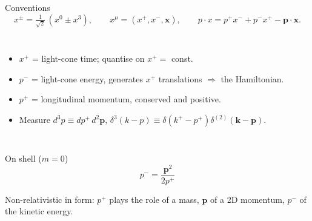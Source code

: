 \documentclass[9pt,aspectratio=169]{beamer}
\newcommand{\hl}[1]{\textcolor{acc}{#1}}
\newcommand{\hb}[1]{\textcolor{blu}{#1}}
\newcommand{\pp}{p^{+}}
\newcommand{\kp}{k^{+}}
\newcommand{\xm}{x^{-}}
\newcommand{\xp}{x^{+}}
\begin{document}
\begin{frame}{Conventions}
\[
x^{\pm}=\tfrac{1}{\sqrt2}\,(x^{0}\pm x^{3}),\qquad
x^{\mu}=(\xp,\xm,\bm x),\qquad
p\cdot x = \pp \xm + p^{-}\xp - \bm p\!\cdot\!\bm x .
\]
\vspace{-6pt}
\begin{columns}[T,onlytextwidth]
\begin{itemize}
  \item $\xp$ = \hl{light-cone time}; quantise on $\xp=$ const.
  \item $p^{-}$ = \hl{light-cone energy}, generates $\xp$ translations $\Rightarrow$ the Hamiltonian.
  \item $\pp$ = longitudinal momentum, \hb{conserved and positive}.
  \item Measure $d^{3}p \equiv d\pp\, d^{2}\bm p$, \;
        $\delta^{3}(k-p)\equiv\delta(\kp-\pp)\delta^{(2)}(\bm k-\bm p)$.
\end{itemize}
\vspace{-10pt}
\begin{center}
\end{center}
\end{columns}
\vspace{-2pt}
\begin{alertblock}{On shell ($m=0$)}
\vspace{-10pt}
\[
p^{-}=\frac{\bm p^{2}}{2\pp}
\]
\vspace{-12pt}
\begin{center}
Non-relativistic in form: $\pp$ plays the role of a mass, $\bm p$ of a 2D momentum,
$p^{-}$ of the kinetic energy.
\end{center}
\end{alertblock}
\end{frame}
\end{document}
